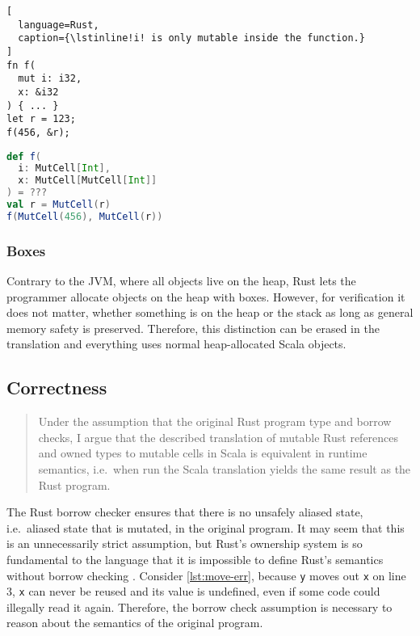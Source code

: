 \noindent\begin{minipage}[t]{.45\textwidth}
\begin{lstlisting}[
  language=Rust,
  caption={\lstinline!i! is only mutable inside the function.}
]
fn f(
  mut i: i32,
  x: &i32
) { ... }
let r = 123;
f(456, &r);
\end{lstlisting}
\end{minipage}\hfill
\begin{minipage}[t]{.45\textwidth}
\begin{lstlisting}[language=Scala]
def f(
  i: MutCell[Int],
  x: MutCell[MutCell[Int]]
) = ???
val r = MutCell(r)
f(MutCell(456), MutCell(r))
\end{lstlisting}
\end{minipage}

\subsubsection{Boxes}

Contrary to the JVM, where all objects live on the heap, Rust lets the
programmer allocate objects on the heap with boxes. However, for verification it
does not matter, whether something is on the heap or the stack as long as
general memory safety is preserved. Therefore, this distinction can be erased in
the translation and everything uses normal heap-allocated Scala objects.

\subsection{Correctness}
\label{correctness-claim}

\begin{quote}
Under the assumption that the original Rust program type and borrow
checks, I argue that the described translation of mutable Rust
references and owned types to mutable cells in Scala is equivalent in
runtime semantics, i.e.~when run the Scala translation yields the same
result as the Rust program.
\end{quote}

The Rust borrow checker ensures that there is no unsafely aliased state,
i.e.~aliased state that is mutated, in the original program. It may seem that
this is an unnecessarily strict assumption, but Rust's ownership system is so
fundamental to the language that it is impossible to define Rust's semantics
without borrow checking \cite{krust}. Consider \autoref{lst:move-err}, because
\lstinline!y! moves out \lstinline!x! on line 3, \lstinline!x! can never be
reused and its value is undefined, even if some code could illegally read it
again. Therefore, the borrow check assumption is necessary to reason about the
semantics of the original program.

